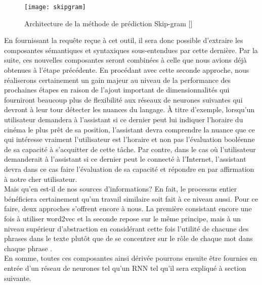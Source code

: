 \begin{figure}[ht]
  \centering
  \texttt{[image: skipgram]}
  \caption{Architecture de la méthode de prédiction Skip-gram []}
  \label{fig:skipgram}
\end{figure}

En fournissant la requête reçue à cet outil, il sera donc possible d'extraire les composantes sémantiques et syntaxiques sous-entendues par cette dernière. Par la suite, ces nouvelles composantes seront combinées à celle que nous avions déjà obtenues à l'étape précédente. En procédant avec cette seconde approche, nous réaliserons certainement un gain majeur au niveau de la performance des prochaines étapes en raison de l'ajout important de dimensionnalités qui fourniront beaucoup plus de flexibilité aux réseaux de neurones suivantes qui devront à leur tour détecter les nuances du langage. À titre d'exemple, lorsqu'un utilisateur demandera à l'assistant si ce dernier peut lui indiquer l'horaire du cinéma le plus prêt de sa position, l'assistant devra comprendre la nuance que ce qui intéresse vraiment l'utilisateur est l'horaire et non pas l'évaluation booléenne de sa capacité à s'acquitter de cette tâche. Par contre, dans le cas où l'utilisateur demanderait à l'assistant si ce dernier peut le connecté à l'Internet, l'assistant devra dans ce cas faire l'évaluation de sa capacité et répondre en par affirmation à notre cher utilisateur. \\

Mais qu'en est-il de nos sources d'informations? En fait, le processus entier bénéficiera certainement qu'un travail similaire soit fait à ce niveau aussi. Pour ce faire, deux approches s'offrent encore à nous. La première consistant encore une fois à utiliser word2vec et la seconde repose sur le même principe, mais à un niveau supérieur d'abstraction en considérant cette fois l'utilité de chacune des phrases dans le texte plutôt que de se concentrer sur le rôle de chaque mot dans chaque phrase \cite{inferSent}. \\

En somme, toutes ces composantes ainsi dérivée pourrons ensuite être fournies en entrée d'un réseau de neurones tel qu'un RNN tel qu'il sera expliqué à section suivante.
